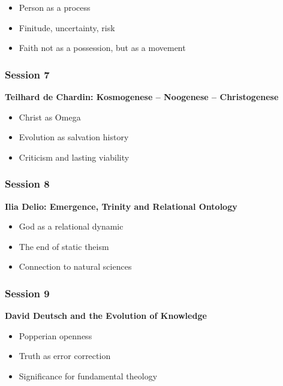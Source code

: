 \documentclass[
]{article}
\begin{document}
\begin{itemize}
\item
  Person as a process
\item
  Finitude, uncertainty, risk
\item
  Faith not as a possession, but as a movement
\end{itemize}

\subsubsection{\texorpdfstring{\textbf{Session 7}}{Session 7}}\label{session-7}

\textbf{Teilhard de Chardin: Kosmogenese -- Noogenese -- Christogenese}

\begin{itemize}
\item
  Christ as Omega
\item
  Evolution as salvation history
\item
  Criticism and lasting viability
\end{itemize}

\subsubsection{\texorpdfstring{\textbf{Session 8}}{Session 8}}\label{session-8}

\textbf{Ilia Delio: Emergence, Trinity and Relational Ontology}

\begin{itemize}
\item
  God as a relational dynamic
\item
  The end of static theism
\item
  Connection to natural sciences
\end{itemize}

\subsubsection{\texorpdfstring{\textbf{Session 9}}{Session 9}}\label{session-9}

\textbf{David Deutsch and the Evolution of Knowledge}

\begin{itemize}
\item
  Popperian openness
\item
  Truth as error correction
\item
  Significance for fundamental theology
\end{itemize}
\end{document}
